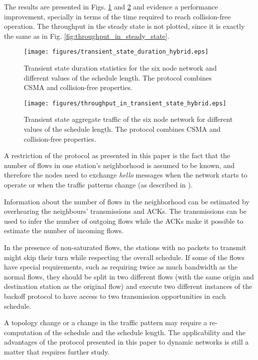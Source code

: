 \documentclass[twocolumn]{svjour3}          \smartqed  \usepackage{graphicx}
\begin{document}
The results are presented in Figs. \ref{fig:transient_state_duration_hybrid} and \ref{fig:throughput_in_transient_state_hybrid} and evidence a performance improvement, specially in terms of the time required to reach collision-free operation.
The throughput in the steady state is not plotted, since it is exactly the same as in Fig. \ref{fig:throughput_in_steady_state}.

\begin{figure}
\centering
  \texttt{[image: figures/transient\_state\_duration\_hybrid.eps]}
\caption{Transient state duration statistics for the six node network and different values of the schedule length. The protocol combines CSMA and collision-free properties.}
\label{fig:transient_state_duration_hybrid}
\end{figure}

\begin{figure}
\centering
  \texttt{[image: figures/throughput\_in\_transient\_state\_hybrid.eps]}
\caption{Transient state aggregate traffic of the six node network for different values of the schedule length. The protocol combines CSMA and collision-free properties.}
\label{fig:throughput_in_transient_state_hybrid}
\end{figure}

A restriction of the protocol as presented in this paper is the fact that the number of flows in one station's neighborhood is assumed to be known, and therefore the nodes need to exchange \emph{hello} messages when the network starts to operate or when the traffic patterns change (as described in \cite{kar2004apf}).

Information about the number of flows in the neighborhood can be estimated by overhearing the neighbours' transmissions and ACKs.
The transmissions can be used to infer the number of outgoing flows while the ACKs make it possible to estimate the number of incoming flows.

In the presence of non-saturated flows, the stations with no packets to transmit might skip their turn while respecting the overall schedule.
If some of the flows have special requirements, such as requiring twice as much bandwidth as the normal flows, they should be split in two different flows (with the same origin and destination station as the original flow) and execute two different instances of the backoff protocol to have access to two transmission opportunities in each schedule.

A topology change or a change in the traffic pattern may require a re-computation of the schedule and the schedule length.
The applicability and the advantages of the protocol presented in this paper to dynamic networks is still a matter that requires further study.
\end{document}
